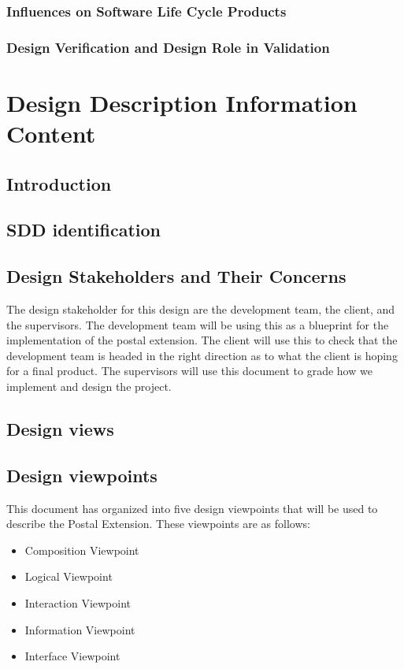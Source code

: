 \documentclass[letterpaper,10pt,titlepage,draftclsnofoot,onecolumn,onesided] {IEEEtran}
\begin{document}
\subsubsection{Influences on Software Life Cycle Products}
\subsubsection{Design Verification and Design Role in Validation}

\section{Design Description Information Content}

\subsection{Introduction}

\subsection{SDD identification}

\subsection{Design Stakeholders and Their Concerns}
The design stakeholder for this design are the development team, the client, and the supervisors.
The development team will be using this as a blueprint for the implementation of the postal extension. 
The client will use this to check that the development team is headed in the right direction as to what the client is hoping for a final product.
The supervisors will use this document to grade how we implement and design the project.

\subsection{Design views}

\subsection{Design viewpoints}
This document has organized into five design viewpoints that will be used to describe the Postal Extension.
These viewpoints are as follows:
\begin {itemize}
\item Composition Viewpoint
\item Logical Viewpoint
\item Interaction Viewpoint
\item Information Viewpoint
\item Interface Viewpoint
\end {itemize}
\end{document}
